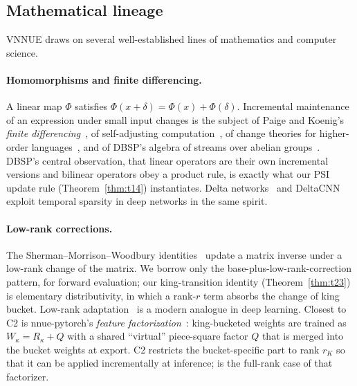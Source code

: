 \documentclass[10pt]{article}
\newcommand{\lnm}[1]{\lean{VNNUE.#1}}
\theoremstyle{plain}
\theoremstyle{definition}
\begin{document}
\subsection{Mathematical lineage}

VNNUE draws on several well-established lines of mathematics and computer science.

\paragraph{Homomorphisms and finite differencing.}
A linear map $\Phi$ satisfies $\Phi(x+\delta)=\Phi(x)+\Phi(\delta)$.
Incremental maintenance of an expression under small input changes is the subject of Paige and Koenig's \emph{finite differencing}~\cite{paige1982}, of self-adjusting computation~\cite{acar2002}, of change theories for higher-order languages~\cite{cai2014}, and of DBSP's algebra of streams over abelian groups~\cite{budiu2023}.
DBSP's central observation, that linear operators are their own incremental versions and bilinear operators obey a product rule, is exactly what our PSI update rule (Theorem~\ref{thm:t14}) instantiates.
Delta networks~\cite{neil2017} and DeltaCNN~\cite{parger2022} exploit temporal sparsity in deep networks in the same spirit.

\paragraph{Low-rank corrections.}
The Sherman--Morrison--Woodbury identities~\cite{sherman1950,woodbury1950} update a matrix inverse under a low-rank change of the matrix.
We borrow only the base-plus-low-rank-correction pattern, for forward evaluation; our king-transition identity (Theorem~\ref{thm:t23}) is elementary distributivity, in which a rank-$r$ term absorbs the change of king bucket.
Low-rank adaptation~\cite{hu2022lora} is a modern analogue in deep learning.
Closest to C2 is nnue-pytorch's \emph{feature factorization}~\cite{nnuepytorchdocs}: king-bucketed weights are trained as $W_\kappa=R_\kappa+Q$ with a shared ``virtual'' piece-square factor $Q$ that is merged into the bucket weights at export.
C2 restricts the bucket-specific part to rank $r_K$ so that it can be applied incrementally at inference; \lnm{lowrank_generalizes} is the full-rank case of that factorizer.
\end{document}
